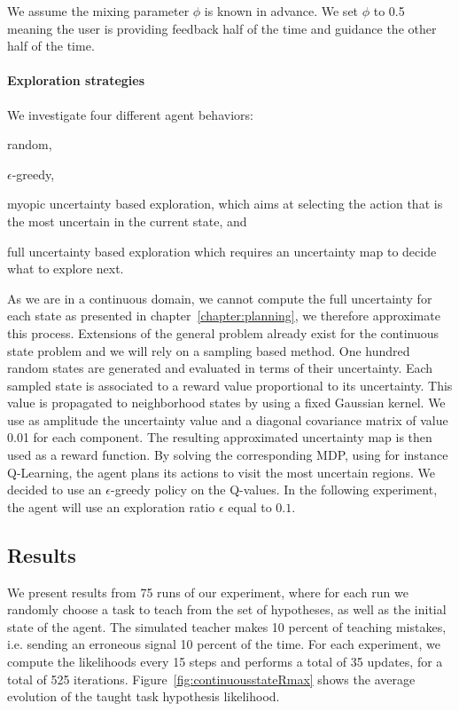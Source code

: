 We assume the mixing parameter $\phi$ is known in advance. We set $\phi$ to 0.5 meaning the user is providing feedback half of the time and guidance the other half of the time. 

\paragraph{Exploration strategies}

We investigate four different agent behaviors: \begin{inparaenum}[a)] \item random, \item $\epsilon$-greedy, \item myopic uncertainty based exploration, which aims at selecting the action that is the most uncertain in the current state, and \item full uncertainty based exploration which requires an uncertainty map to decide what to explore next. \end{inparaenum} 

As we are in a continuous domain, we cannot compute the full uncertainty for each state as presented in chapter~\ref{chapter:planning}, we therefore approximate this process. Extensions of the general problem already exist for the continuous state problem \cite{nouri2010dimension,Hester13aamas} and we will rely on a sampling based method. One hundred random states are generated and evaluated in terms of their uncertainty. Each sampled state is associated to a reward value proportional to its uncertainty. This value is propagated to neighborhood states by using a fixed Gaussian kernel. We use as amplitude the uncertainty value and a diagonal covariance matrix of value 0.01 for each component. The resulting approximated uncertainty map is then used as a reward function. By solving the corresponding MDP, using for instance Q-Learning, the agent plans its actions to visit the most uncertain regions. We decided to use an $\epsilon$-greedy policy on the Q-values. In the following experiment, the agent will use an exploration ratio $\epsilon$ equal to $0.1$.

\subsection{Results}

We present results from 75 runs of our experiment, where for each run we randomly choose a task to teach from the set of hypotheses, as well as the initial state of the agent. The simulated teacher makes 10 percent of teaching mistakes, i.e. sending an erroneous signal 10 percent of the time. For each experiment, we compute the likelihoods every 15 steps and performs a total of 35 updates, for a total of 525 iterations. Figure~\ref{fig:continuousstateRmax} shows the average evolution of the taught task hypothesis likelihood.

